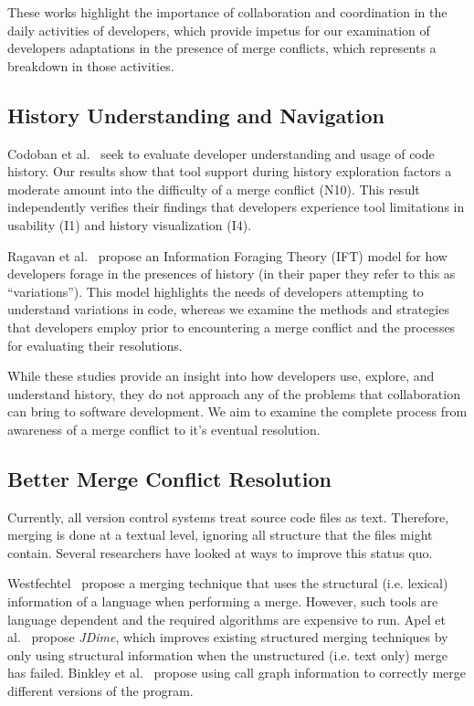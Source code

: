 These works highlight the importance of collaboration and coordination in the daily activities of developers, which provide impetus for our examination of developers adaptations in the presence of merge conflicts, which represents a breakdown in those activities.

\subsection{History Understanding and Navigation}

Codoban et al.~\cite{Mihai_lenses} seek to evaluate developer understanding and usage of code history. 
Our results show that tool support during history exploration factors a moderate amount into the difficulty of a merge conflict (N10). 
This result independently verifies their findings that developers experience tool limitations in usability (I1) and history visualization (I4).

Ragavan et al.~\cite{ragavan_pfis-v_2017} propose an Information Foraging Theory (IFT) model for how developers forage in the presences of history (in their paper they refer to this as ``variations'').
This model highlights the needs of developers attempting to understand variations in code, whereas we examine the methods and strategies that developers employ prior to encountering a merge conflict and the processes for evaluating their resolutions.

While these studies provide an insight into how developers use, explore, and understand history, they do not approach any of the problems that collaboration can bring to software development.
We aim to examine the complete process from awareness of a merge conflict to it's eventual resolution.

\subsection{Better Merge Conflict Resolution}

Currently, all version control systems treat source code files as text.
Therefore, merging is done at a textual level, ignoring all structure that the files might contain.
Several researchers have looked at ways to improve this status quo.

Westfechtel~\cite{westfechtel_structure-oriented_1991} propose a merging technique that uses the structural (i.e. lexical) information of a language when performing a merge. However, such tools are language dependent and the required algorithms are expensive to run.
Apel et al.~\cite{apel_structured_2012-1, apel_semistructured_2011} propose \emph{JDime}, which improves existing structured merging techniques by only using structural information when the unstructured (i.e. text only) merge has failed.
Binkley et al.~\cite{binkley_program_1995} propose using call graph information to correctly merge different versions of the program.

